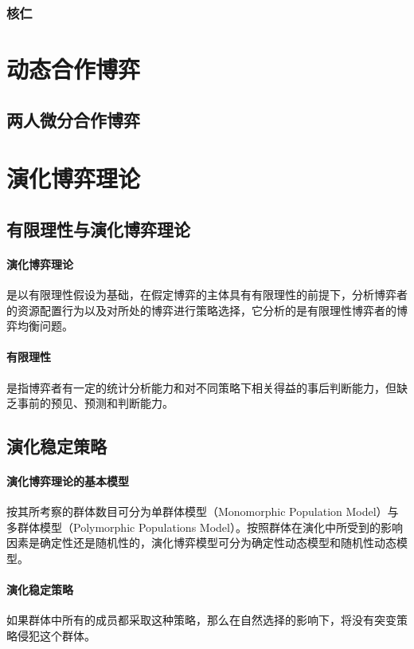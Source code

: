 \documentclass[12pt,a4paper]{article}
\begin{document}
\subsubsection{核仁}

\section{动态合作博弈}
\subsection{两人微分合作博弈}

\newpage
\section{演化博弈理论}
\subsection{有限理性与演化博弈理论}
\paragraph{演化博弈理论} 是以有限理性假设为基础，在假定博弈的主体具有有限理性的前提下，分析博弈者的资源配置行为以及对所处的博弈进行策略选择，它分析的是有限理性博弈者的博弈均衡问题。
\paragraph{有限理性} 是指博弈者有一定的统计分析能力和对不同策略下相关得益的事后判断能力，但缺乏事前的预见、预测和判断能力。
\subsection{演化稳定策略}
\paragraph{演化博弈理论的基本模型} 按其所考察的群体数目可分为单群体模型（Monomorphic Population Model）与多群体模型（Polymorphic Populations Model）。按照群体在演化中所受到的影响因素是确定性还是随机性的，演化博弈模型可分为确定性动态模型和随机性动态模型。
\paragraph{演化稳定策略} 如果群体中所有的成员都采取这种策略，那么在自然选择的影响下，将没有突变策略侵犯这个群体。
\newpage


\end{document}
